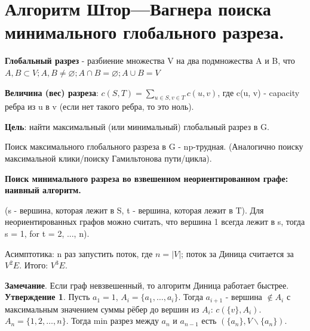 \setcounter{section}{86}
\section{Алгоритм Штор—Вагнера поиска минимального глобального разреза.}

\textbf{Глобальный разрез} - разбиение множества V на два подмножества A и B, что $A, B \subset V; A, B \neq \varnothing; A \cap B = \varnothing; A \cup B = V$

\textbf{Величина (вес) разреза}: $c (S, T) = \sum_{u \in S, v\in T} c(u, v)$, где c(u, v) - capacity ребра из u в v (если нет такого ребра, то это ноль).

\textbf{Цель}: найти максимальный (или минимальный) глобальный разрез в G.

Поиск максимального глобального разреза в G - np-трудная. (Аналогично поиску максимальной клики/поиску Гамильтонова пути/цикла).

\textbf{Поиск минимального разреза во взвешенном неориентированном графе: наивный алгоритм.}

\begin{figure}[h]
\end{figure}

(s - вершина, которая лежит в S, t - вершина, которая лежит в T). Для неориентированных графов можно считать, что вершина 1 всегда лежит в s, тогда s = 1, for t = 2, ..., n).

Асимптотика: n раз запустить поток, где $n = |V|$; поток за Диница считается за $V^2E$. Итого: $V^3E$.

\textbf{Замечание}. Если граф невзвешенный, то алгоритм Диница работает быстрее. \\

\textbf{Утверждение 1}. Пусть $a_1 = 1$, $A_i = \{a_1, \dots, a_i \}$. Тогда $a_{i+1}$ - вершина $\notin A_i$ с максимальным значением суммы рёбер до вершин из $A_i$: $c(\{v\}, A_i)$. $A_n = \{ 1, 2, \dots, n \}$. Тогда min разрез между $a_n$ и $a_{n-1}$ есть $(\{a_n\}, V\backslash \{a_n\})$. 

